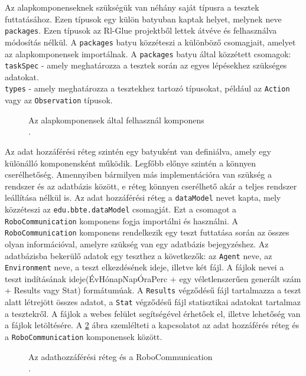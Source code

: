 Az alapkomponenseknek szükségük van néhány saját típusra a tesztek futtatásához. Ezen típusok egy külön batyuban kaptak helyet, melynek neve \texttt{packages}. Ezen típusok az Rl-Glue projektből lettek átvéve és felhasználva módosítás nélkül. A \texttt{packages} batyu közzéteszi a különböző csomagjait, amelyet az alapkomponensek importálnak. A \texttt{packages} batyu által közzétett csomagok:
\\
\texttt{taskSpec} - amely meghatározza a tesztek során az egyes lépésekhez szükséges adatokat.
\\
\texttt{types} - amely meghatározza a tesztekhez tartozó típusokat, például az \texttt{Action} vagy az \texttt{Observation} típusok.

\begin{figure}[h!]
  \centering
  \caption[Az alapkomponensek által felhasznál komponens]%
  {Az alapkomponensek által felhasznál komponens\\
  {\white .}\hfill\url{}}
  \label{fig:PackagesKomponens}
\end{figure}


Az adat hozzáférési réteg szintén egy batyuként van definiálva, amely egy különálló komponensként működik. Legfőbb előnye szintén a könnyen cserélhetőség. Amennyiben bármilyen más implementációra van szükség a rendszer és az adatbázis között, e réteg könnyen cserélhető akár a teljes rendszer leállítása nélkül is. Az adat hozzáférési réteg a \texttt{dataModel} nevet kapta, mely közzéteszi az \texttt{edu.bbte.dataModel} csomagját. Ezt a csomagot a \texttt{RoboCommunication} komponens fogja importálni és használni. A \texttt{RoboCommunication} komponens rendelkezik egy teszt futtatása során az összes olyan információval, amelyre szükség van egy adatbázis bejegyzéshez. Az adatbázisba bekerülő adatok egy teszthez a következők: az \texttt{Agent} neve, az \texttt{Environment} neve, a teszt elkezdésének ideje, illetve két fájl. A fájlok nevei a teszt indításának ideje(ÉvHónapNapÓraPerc + egy véletlenszerűen generált szám + Results vagy Stat) formátumúak. A \texttt{Results} végződésű fájl tartalmazza a teszt alatt létrejött összes adatot, a \texttt{Stat} végződésű fájl statisztikai adatokat tartalmaz a tesztekről. A fájlok a webes felület segítségével érhetőek el, illetve lehetőség van a fájlok letöltésére. A \ref{fig:dataModelRobo} ábra szemlélteti a kapcsolatot az adat hozzáférés réteg és a \texttt{RoboCommunication} komponensek között. 

\begin{figure}[h!]
  \centering
  \caption[Az adathozzáférési réteg és a RoboCommunication]%
  {Az adathozzáférési réteg és a RoboCommunication\\
  {\white .}\hfill\url{}}
  \label{fig:dataModelRobo}
\end{figure}

